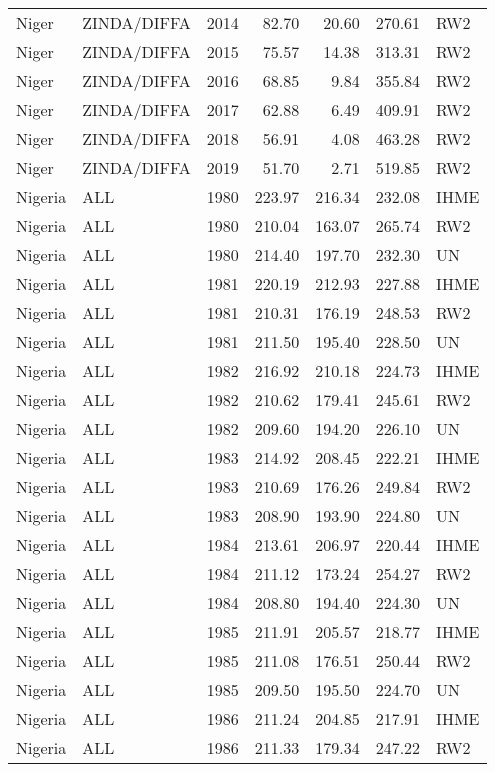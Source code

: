 \begin{longtable}{lllrrrl}
  Niger & ZINDA/DIFFA & 2014 & 82.70 & 20.60 & 270.61 & RW2 \\ 
  Niger & ZINDA/DIFFA & 2015 & 75.57 & 14.38 & 313.31 & RW2 \\ 
  Niger & ZINDA/DIFFA & 2016 & 68.85 & 9.84 & 355.84 & RW2 \\ 
  Niger & ZINDA/DIFFA & 2017 & 62.88 & 6.49 & 409.91 & RW2 \\ 
  Niger & ZINDA/DIFFA & 2018 & 56.91 & 4.08 & 463.28 & RW2 \\ 
  Niger & ZINDA/DIFFA & 2019 & 51.70 & 2.71 & 519.85 & RW2 \\ 
  Nigeria & ALL & 1980 & 223.97 & 216.34 & 232.08 & IHME \\ 
  Nigeria & ALL & 1980 & 210.04 & 163.07 & 265.74 & RW2 \\ 
  Nigeria & ALL & 1980 & 214.40 & 197.70 & 232.30 & UN \\ 
  Nigeria & ALL & 1981 & 220.19 & 212.93 & 227.88 & IHME \\ 
  Nigeria & ALL & 1981 & 210.31 & 176.19 & 248.53 & RW2 \\ 
  Nigeria & ALL & 1981 & 211.50 & 195.40 & 228.50 & UN \\ 
  Nigeria & ALL & 1982 & 216.92 & 210.18 & 224.73 & IHME \\ 
  Nigeria & ALL & 1982 & 210.62 & 179.41 & 245.61 & RW2 \\ 
  Nigeria & ALL & 1982 & 209.60 & 194.20 & 226.10 & UN \\ 
  Nigeria & ALL & 1983 & 214.92 & 208.45 & 222.21 & IHME \\ 
  Nigeria & ALL & 1983 & 210.69 & 176.26 & 249.84 & RW2 \\ 
  Nigeria & ALL & 1983 & 208.90 & 193.90 & 224.80 & UN \\ 
  Nigeria & ALL & 1984 & 213.61 & 206.97 & 220.44 & IHME \\ 
  Nigeria & ALL & 1984 & 211.12 & 173.24 & 254.27 & RW2 \\ 
  Nigeria & ALL & 1984 & 208.80 & 194.40 & 224.30 & UN \\ 
  Nigeria & ALL & 1985 & 211.91 & 205.57 & 218.77 & IHME \\ 
  Nigeria & ALL & 1985 & 211.08 & 176.51 & 250.44 & RW2 \\ 
  Nigeria & ALL & 1985 & 209.50 & 195.50 & 224.70 & UN \\ 
  Nigeria & ALL & 1986 & 211.24 & 204.85 & 217.91 & IHME \\ 
  Nigeria & ALL & 1986 & 211.33 & 179.34 & 247.22 & RW2 \\ 

\end{longtable}
